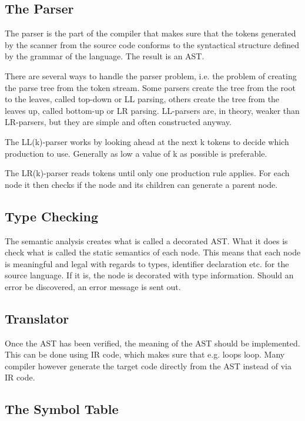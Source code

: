 \subsection{The Parser}

The parser is the part of the compiler that makes sure that the tokens generated by the scanner from the source code conforms to the syntactical structure defined by the grammar of the language. The result is an AST. 

There are several ways to handle the parser problem, i.e. the problem of creating the parse tree from the token stream. Some parsers create the tree from the root to the leaves, called top-down or LL parsing, others create the tree from the leaves up, called bottom-up or LR parsing. LL-parsers are, in theory, weaker than LR-parsers, but they are simple and often constructed anyway.

The LL(k)-parser works by looking ahead at the next k tokens to decide which production to use. Generally as low a value of k as possible is preferable. 

The LR(k)-parser reads tokens until only one production rule applies. For each node it then checks if the node and its children can generate a parent node.

\subsection{Type Checking}

The semantic analysis creates what is called a decorated AST. What it does is check what is called the static semantics of each node. This means that each node is meaningful and legal with regards to types, identifier declaration etc. for the source language. If it is, the node is decorated with  type information. Should an error be discovered, an error message is sent out.

\subsection{Translator}

Once the AST has been verified, the meaning of the AST should be implemented. This can be done using IR code, which makes sure that e.g. loops loop. Many compiler however generate the target code directly from the AST instead of via IR code.

\subsection{The Symbol Table}

